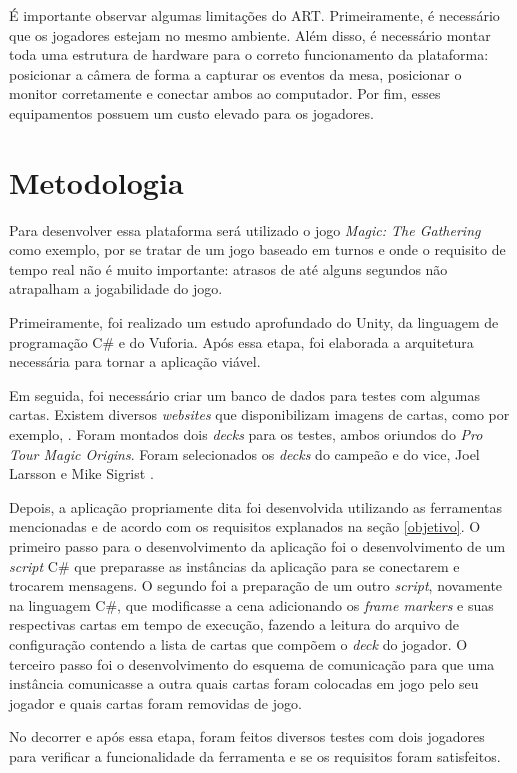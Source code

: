 \documentclass[conference]{IEEEtran}
\begin{document}
É importante observar algumas limitações do ART. Primeiramente, é necessário 
que os jogadores estejam no mesmo ambiente. Além disso, é necessário montar 
toda uma estrutura de hardware para o correto funcionamento da plataforma: 
posicionar a câmera de forma a capturar os eventos da mesa, posicionar o monitor 
corretamente e conectar ambos ao computador. Por fim, esses equipamentos 
possuem um custo elevado para os jogadores.

\section{Metodologia}
\label{metodologia}
Para desenvolver essa plataforma será utilizado o jogo \textit{Magic: The 
Gathering} como exemplo, por se tratar de um jogo baseado em turnos e onde 
o requisito de tempo real não é muito importante: atrasos de até alguns segundos 
não atrapalham a jogabilidade do jogo. 

Primeiramente, foi realizado um estudo aprofundado do Unity, da linguagem de 
programação C\# \cite{csharp} e do Vuforia. Após essa etapa, foi elaborada a 
arquitetura necessária para tornar a aplicação viável.

Em seguida, foi necessário criar um banco de dados para testes com algumas 
cartas. Existem diversos \textit{websites} que disponibilizam imagens de cartas, 
como por exemplo, \cite{magic_cards}. Foram montados dois \textit{decks} para 
os testes, ambos oriundos do \textit{Pro Tour Magic Origins}. Foram 
selecionados os \textit{decks} do campeão e do vice, Joel Larsson e Mike Sigrist 
\cite{protour}.

Depois, a aplicação propriamente dita foi desenvolvida utilizando as ferramentas 
mencionadas e de acordo com os requisitos explanados na seção \ref{objetivo}.
O primeiro passo para o desenvolvimento da aplicação foi o desenvolvimento de 
um \textit{script} C\# que preparasse as instâncias da aplicação para se 
conectarem e trocarem mensagens. O segundo foi a preparação de um outro 
\textit{script}, novamente na linguagem C\#, que modificasse a cena adicionando 
os \textit{frame markers} e suas respectivas cartas em tempo de execução, 
fazendo a leitura do arquivo de configuração contendo a lista de cartas que 
compõem o \textit{deck} do jogador. O terceiro passo foi o desenvolvimento do 
esquema de comunicação para que uma instância comunicasse a outra quais cartas 
foram colocadas em jogo pelo seu jogador e quais cartas foram removidas de jogo.

No decorrer e após essa etapa, foram feitos diversos testes com dois jogadores 
para verificar a funcionalidade da ferramenta e se os requisitos foram 
satisfeitos.
\end{document}
